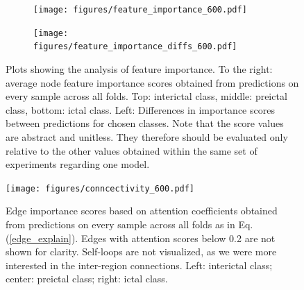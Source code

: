 \documentclass[a4paper,fleqn]{cas-sc}
\begin{document}


\begin{figure}[h!]
	\centering
	\begin{subfigure}{0.45\linewidth}
            \centering
		\texttt{[image: figures/feature\_importance\_600.pdf]}
		
		\label{fig:feature-importance-overall}
	\end{subfigure}
	\begin{subfigure}{0.45\linewidth}
            \centering
		\texttt{[image: figures/feature\_importance\_diffs\_600.pdf]}

		\label{fig:feature-importance-diffs}
	\end{subfigure}
	\caption{Plots showing the analysis of feature importance. To the right: average node feature importance scores obtained from predictions on every sample across all folds. Top: interictal class, middle: preictal class, bottom: ictal class. Left: Differences in importance scores between predictions
for chosen classes. Note that the score values are abstract and unitless. They therefore should be evaluated only relative to the other values obtained within the same set of experiments regarding one model.}
	\label{fig:feature-importance}
\end{figure}
 
\begin{figure}[h]
    \centering
    \texttt{[image: figures/conncectivity\_600.pdf]}
    \caption{Edge importance scores based on attention coefficients obtained from predictions on every sample across all folds as in Eq. (\ref{edge_explain}). Edges with attention scores below 0.2 are not shown for clarity. Self-loops are not visualized, as we were more interested in the inter-region connections. Left: interictal class; center: preictal class; right: ictal class.}
    \label{fig:connectivity}
\end{figure}
\FloatBarrier
\end{document}
